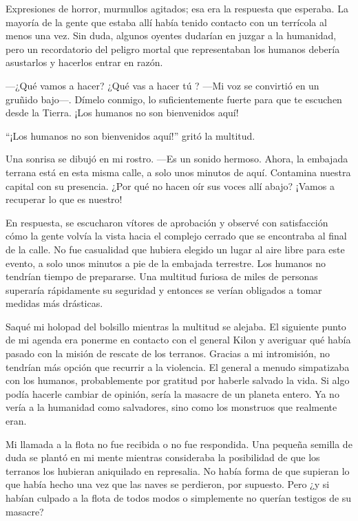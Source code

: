 Expresiones de horror, murmullos agitados; esa era la respuesta que esperaba. La mayoría de la gente que estaba allí había tenido contacto con un terrícola al menos una vez. Sin duda, algunos oyentes dudarían en juzgar a la humanidad, pero un recordatorio del peligro mortal que representaban los humanos debería asustarlos y hacerlos entrar en razón.

—¿Qué vamos a hacer? ¿Qué vas a hacer tú ? —Mi voz se convirtió en un gruñido bajo—. Dímelo conmigo, lo suficientemente fuerte para que te escuchen desde la Tierra. ¡Los humanos no son bienvenidos aquí!

``¡Los humanos no son bienvenidos aquí!'' gritó la multitud.

Una sonrisa se dibujó en mi rostro. —Es un sonido hermoso. Ahora, la embajada terrana está en esta misma calle, a solo unos minutos de aquí. Contamina nuestra capital con su presencia. ¿Por qué no hacen oír sus voces allí abajo? ¡Vamos a recuperar lo que es nuestro!

En respuesta, se escucharon vítores de aprobación y observé con satisfacción cómo la gente volvía la vista hacia el complejo cerrado que se encontraba al final de la calle. No fue casualidad que hubiera elegido un lugar al aire libre para este evento, a solo unos minutos a pie de la embajada terrestre. Los humanos no tendrían tiempo de prepararse. Una multitud furiosa de miles de personas superaría rápidamente su seguridad y entonces se verían obligados a tomar medidas más drásticas.

Saqué mi holopad del bolsillo mientras la multitud se alejaba. El siguiente punto de mi agenda era ponerme en contacto con el general Kilon y averiguar qué había pasado con la misión de rescate de los terranos. Gracias a mi intromisión, no tendrían más opción que recurrir a la violencia. El general a menudo simpatizaba con los humanos, probablemente por gratitud por haberle salvado la vida. Si algo podía hacerle cambiar de opinión, sería la masacre de un planeta entero. Ya no vería a la humanidad como salvadores, sino como los monstruos que realmente eran.

Mi llamada a la flota no fue recibida o no fue respondida. Una pequeña semilla de duda se plantó en mi mente mientras consideraba la posibilidad de que los terranos los hubieran aniquilado en represalia. No había forma de que supieran lo que había hecho una vez que las naves se perdieron, por supuesto. Pero ¿y si habían culpado a la flota de todos modos o simplemente no querían testigos de su masacre?

